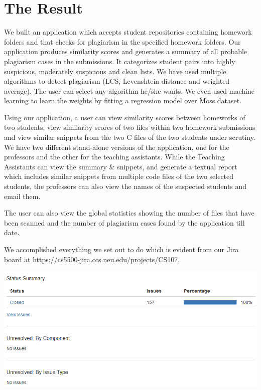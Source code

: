 \documentclass[12pt]{article}
\begin{document}
\section{The Result}
We built an application which accepts student repositories containing homework folders and that checks for plagiarism in the specified homework folders. Our application produces similarity scores and generates a summary of all probable plagiarism cases in the submissions. It categorizes student pairs into highly suspicious, moderately suspicious and clean lists.
We have used multiple algorithms to detect plagiarism (LCS, Levenshtein distance and weighted average). The user can select any algorithm he/she wants. We even used machine learning to learn the weights by fitting a regression model over Moss dataset. \par
Using our application, a user can view similarity scores between homeworks of two students, view similarity scores of two files within two homework submissions and view similar snippets from the two C files of the two students under scrutiny. 
We have two different stand-alone versions of the application, one for the professors and the other for the teaching assistants. While the Teaching Assistants can view the summary \& snippets, and generate a textual report which includes similar snippets from multiple code files of the two selected students, the professors can also view the names of the suspected students and email them. \par
The user can also view the global statistics showing the number of files that have been scanned and the number of plagiarism cases found by the application till date.\par
We accomplished everything we set out to do which is evident from our Jira board at https://cs5500-jira.ccs.neu.edu/projects/CS107.\par
\begin{center}
\includegraphics[scale = 0.5]{jira}
\end{center}
\end{document}

